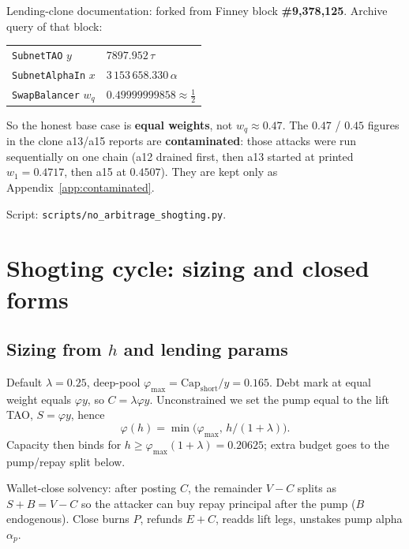 \documentclass[11pt]{article}
\theoremstyle{definition}
\theoremstyle{remark}
\begin{document}
Lending-clone documentation: forked from Finney block
\textbf{\#9,378,125}. Archive query of that block:

\begin{center}
\begin{tabular}{@{}ll@{}}
\toprule
\texttt{SubnetTAO} $y$ & $7897.952\,\tau$ \\
\texttt{SubnetAlphaIn} $x$ & $3\,153\,658.330\,\alpha$ \\
\texttt{SwapBalancer} $w_q$ & $0.49999999858\approx\tfrac12$ \\
\bottomrule
\end{tabular}
\end{center}

\noindent So the honest base case is \textbf{equal weights}, not
$w_q\approx 0.47$. The $0.47$ / $0.45$ figures in the clone a13/a15
reports are \textbf{contaminated}: those attacks were run sequentially
on one chain (a12 drained first, then a13 started at printed
$w_1=0.4717$, then a15 at $0.4507$). They are kept only as
Appendix~\ref{app:contaminated}.

Script: \texttt{scripts/no\_arbitrage\_shogting.py}.

\section{Shogting cycle: sizing and closed forms}
\label{sec:closed}

\subsection{Sizing from $h$ and lending params}
Default $\lambda=0.25$, deep-pool
$\varphi_{\max}=\mathrm{Cap}_{\mathrm{short}}/y=0.165$.
Debt mark at equal weight equals $\varphi y$, so $C=\lambda\varphi y$.
Unconstrained we set the pump equal to the lift TAO,
$S=\varphi y$, hence
\begin{equation}
\label{eq:phi-h}
\varphi(h)=\min\bigl(\varphi_{\max},\, h/(1+\lambda)\bigr).
\end{equation}
Capacity then binds for $h\ge\varphi_{\max}(1+\lambda)=0.20625$; extra
budget goes to the pump/repay split below.

Wallet-close solvency: after posting $C$, the remainder $V-C$ splits as
$S+B=V-C$ so the attacker can buy repay principal after the pump
($B$ endogenous). Close burns $P$, refunds $E+C$, readds lift legs,
unstakes pump alpha $\alpha_p$.
\end{document}
